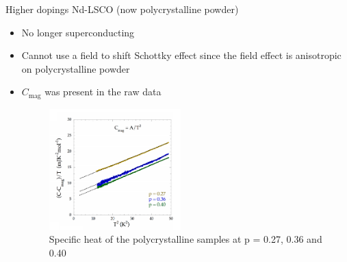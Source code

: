 \documentclass{beamer}
\begin{document}
\begin{frame}{Higher dopings Nd-LSCO (now polycrystalline powder)}
\begin{itemize}
\item No longer superconducting
\item Cannot use a field to shift Schottky effect since the field effect is anisotropic on polycrystalline powder
\item $C_{\text{mag}}$ was present in the raw data
\begin{figure}
\includegraphics[width=2in]{figs/nd_high_dopings.png}
\caption*{Specific heat of the polycrystalline samples at p = 0.27, 0.36 and 0.40}
\end{figure}
\end{itemize}
\end{frame}
\end{document}
